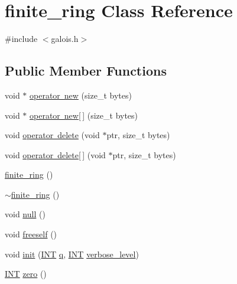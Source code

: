 \hypertarget{classfinite__ring}{}\section{finite\+\_\+ring Class Reference}
\label{classfinite__ring}


{\ttfamily \#include $<$galois.\+h$>$}

\subsection*{Public Member Functions}
\begin{DoxyCompactItemize}
\item 
void $\ast$ \mbox{\hyperlink{classfinite__ring_a95828bc9149d5c6bf360fcec825f8b21}{operator new}} (size\+\_\+t bytes)
\item 
void $\ast$ \mbox{\hyperlink{classfinite__ring_adefd70790e2fb148d980dadc54af0628}{operator new\mbox{[}$\,$\mbox{]}}} (size\+\_\+t bytes)
\item 
void \mbox{\hyperlink{classfinite__ring_ae9dcbc215f4a1148eee19f2eacf5367c}{operator delete}} (void $\ast$ptr, size\+\_\+t bytes)
\item 
void \mbox{\hyperlink{classfinite__ring_aa2575e492df0f3104cbf7e72b8e7e714}{operator delete\mbox{[}$\,$\mbox{]}}} (void $\ast$ptr, size\+\_\+t bytes)
\item 
\mbox{\hyperlink{classfinite__ring_a3dfb141013709944f0eb8b03aee1b9c3}{finite\+\_\+ring}} ()
\item 
\mbox{\hyperlink{classfinite__ring_ac75353244c3c4640ba44db9bc20a6297}{$\sim$finite\+\_\+ring}} ()
\item 
void \mbox{\hyperlink{classfinite__ring_a548ad1baa37d8b0a537a0d8cdc601955}{null}} ()
\item 
void \mbox{\hyperlink{classfinite__ring_afe11cfb1049e98833001fc249825ec3d}{freeself}} ()
\item 
void \mbox{\hyperlink{classfinite__ring_a138196727f10c7b36444533e027f5e38}{init}} (\mbox{\hyperlink{galois_8h_a09fddde158a3a20bd2dcadb609de11dc}{I\+NT}} \mbox{\hyperlink{classfinite__ring_a3c2ea6f3a5c83681ce5284ac2860b576}{q}}, \mbox{\hyperlink{galois_8h_a09fddde158a3a20bd2dcadb609de11dc}{I\+NT}} \mbox{\hyperlink{simeon_8_c_a818073fbcc2f439e7c56952f67386122}{verbose\+\_\+level}})
\item 
\mbox{\hyperlink{galois_8h_a09fddde158a3a20bd2dcadb609de11dc}{I\+NT}} \mbox{\hyperlink{classfinite__ring_ab258d71de0aef4797d83ff0d98bec144}{zero}} ()
\item 

\end{DoxyCompactItemize}
